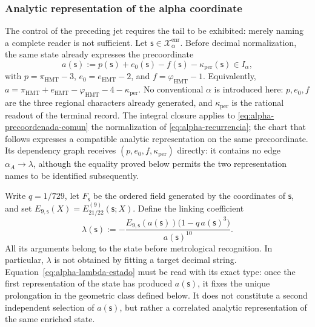 \subsubsection{Analytic representation of the alpha coordinate}
\label{subsec:alpha-lector-completo-rev08}

The control of the preceding jet requires the tail to be exhibited: merely
naming a complete reader is not sufficient. Let
\(\mathsf s\in\mathcal X_\alpha^{\mathrm{enr}}\). Before decimal
normalization, the same state already expresses the precoordinate
\begin{equation}
 a(\mathsf s):=p(\mathsf s)+e_0(\mathsf s)-f(\mathsf s)
                 -\kappa_{\mathrm{per}}(\mathsf s)\in I_\alpha,
 \label{eq:alpha-precoordenada-comun}
\end{equation}
with \(p=\pi_{\mathrm{HMT}}-3\), \(e_0=e_{\mathrm{HMT}}-2\), and
\(f=\varphi_{\mathrm{HMT}}-1\). Equivalently,
\(a=\pi_{\mathrm{HMT}}+e_{\mathrm{HMT}}-
\varphi_{\mathrm{HMT}}-4-\kappa_{\mathrm{per}}\). No conventional
\(\alpha\) is introduced here: \(p,e_0,f\) are the three regional
characters already generated, and \(\kappa_{\mathrm{per}}\) is the rational
readout of the terminal record. The integral closure applies to
\eqref{eq:alpha-precoordenada-comun} the normalization of
\eqref{eq:alpha-recurrencia}; the chart that follows expresses a
compatible analytic representation on the same precoordinate. Its dependency
graph receives \((p,e_0,f,\kappa_{\mathrm{per}})\) directly: it contains no
edge \(\alpha_A\to\lambda\), although the equality proved below permits the
two representation names to be identified subsequently.

Write \(q=1/729\), let \(F_{\mathsf s}\) be the ordered field generated by
the coordinates of \(\mathsf s\), and set
\(E_{9,\mathsf s}(X)=E_{21/22}^{(9)}(\mathsf s;X)\). Define the linking
coefficient
\begin{equation}
 \lambda(\mathsf s):=
 -\frac{E_{9,\mathsf s}(a(\mathsf s))
         \bigl(1-q\,a(\mathsf s)^3\bigr)}{a(\mathsf s)^{10}}.
 \label{eq:alpha-lambda-estado}
\end{equation}
All its arguments belong to the state before metrological recognition. In
particular, \(\lambda\) is not obtained by fitting a target decimal string.
Equation~\eqref{eq:alpha-lambda-estado} must be read with its exact type: once
the first representation of the state has produced \(a(\mathsf s)\), it fixes
the unique prolongation in the geometric class defined below. It does not
constitute a second independent selection of \(a(\mathsf s)\), but rather a
correlated analytic representation of the same enriched state.

